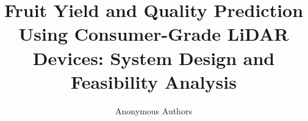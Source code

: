 \documentclass[journal]{IEEEtran}
\begin{document}
\title{Fruit Yield and Quality Prediction Using Consumer-Grade LiDAR Devices: System Design and Feasibility Analysis}

\author{Anonymous Authors}

\maketitle










\end{document}
